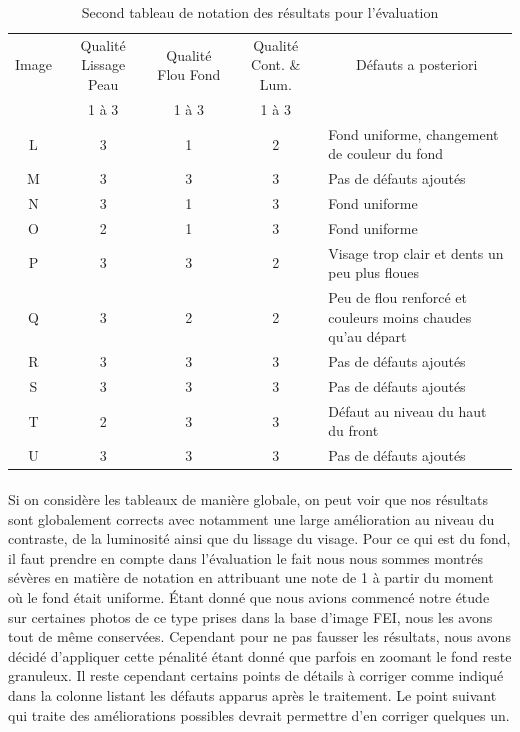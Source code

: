 \documentclass[11pt, french,screen]{report-rd-info}
\begin{document}
\begin{table}
\centering
\caption{Second tableau de notation des résultats pour l'évaluation}
\begin{tabular}{|c|c|c|c|p{3cm}|}
\hline
\multicolumn{ 1}{|c|}{Image} & Qualité Lissage Peau & Qualité Flou Fond & Qualité Cont. \& Lum. & \multicolumn{ 1}{c|}{Défauts a posteriori} \\ \cline{ 2- 4}
\multicolumn{ 1}{|c|}{} & 1 à 3 & 1 à 3 & 1 à 3 & \multicolumn{ 1}{c|}{} \\ \hline
L & 3 & 1 & 2 & Fond uniforme, changement de couleur du fond \\ \hline
M & 3 & 3 & 3 & Pas de défauts ajoutés \\ \hline
N & 3 & 1 & 3 & Fond uniforme \\ \hline
O & 2 & 1 & 3 & Fond uniforme \\ \hline
P & 3 & 3 & 2 & Visage trop clair et dents un peu plus floues \\ \hline
Q & 3 & 2 & 2 & Peu de flou renforcé et couleurs moins chaudes qu'au départ \\ \hline
R & 3 & 3 & 3 & Pas de défauts ajoutés \\ \hline
S & 3 & 3 & 3 & Pas de défauts ajoutés \\ \hline
T & 2 & 3 & 3 & Défaut au niveau du haut du front \\ \hline
U & 3 & 3 & 3 & Pas de défauts ajoutés \\ \hline
\end{tabular}
\label{TableauEvaluation2}
\end{table}

\paragraph*{}
Si on considère les tableaux de manière globale, on peut voir que nos résultats sont globalement corrects avec notamment une large amélioration au niveau du contraste, de la luminosité ainsi que du lissage du visage. Pour ce qui est du fond, il faut prendre en compte dans l’évaluation le fait nous nous sommes montrés sévères en matière de notation en attribuant une note de 1 à partir du moment où le fond était uniforme. Étant donné que nous avions commencé notre étude sur certaines photos de ce type prises dans la base d’image FEI, nous les avons tout de même conservées. Cependant pour ne pas fausser les résultats, nous avons décidé d’appliquer cette pénalité étant donné que parfois en zoomant le fond reste granuleux.
Il reste cependant certains points de détails à corriger comme indiqué dans la colonne listant les défauts apparus après le traitement. Le point suivant qui traite des améliorations possibles devrait permettre d’en corriger quelques un.
\end{document}
